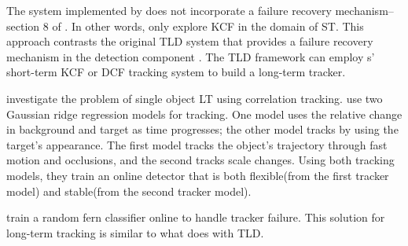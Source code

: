 The system implemented by \citeauthor{Enriques2014} does not incorporate a failure recovery mechanism--section 8 of \cite{Enriques2014}.
In other words, \citeauthor{Enriques2014} only explore KCF in the domain of ST.
This approach contrasts the original TLD system that provides a failure recovery mechanism in the detection component \cite{Kalal2011}.
The TLD framework can employ \citeauthor{Enriques2014}s' short-term KCF or DCF tracking system  to build a long-term tracker.

\citeauthor{Ma2015Correlation} \cite{Ma2015Correlation} investigate the problem of single object LT using correlation tracking.
\citeauthor{Ma2015Correlation} use two Gaussian ridge regression \cite{murphy2012} models for tracking.
One model uses the relative change in background and target as time progresses; the other model tracks by using the target's appearance.
The first model tracks the object's trajectory through fast motion and occlusions, and the second tracks scale changes.
Using both tracking models, they train an online detector that is both flexible(from the first tracker model) and stable(from the second tracker model).

\citeauthor{Ma2015Correlation} train a random fern classifier \cite{ferns2007, Kalal2011} online to handle tracker failure.
This solution for long-term tracking is similar to what \citeauthor{KalalPHD} does with TLD.
